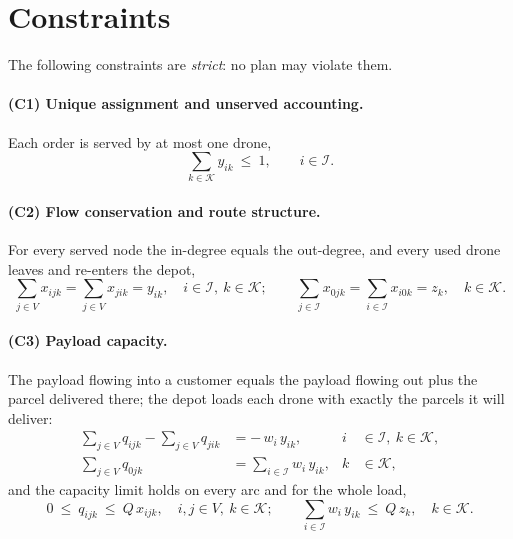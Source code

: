 \documentclass[11pt,a4paper]{article}
\begin{document}
\section{Constraints}

The following constraints are \emph{strict}: no plan may violate them.

\paragraph{(C1) Unique assignment and unserved accounting.}
Each order is served by at most one drone,
\begin{equation}
  \sum_{k\in\mathcal{K}} y_{ik} \ \le \ 1,
  \qquad i \in \mathcal{I}.
  \label{eq:ddrp-assign}
\end{equation}

\paragraph{(C2) Flow conservation and route structure.}
For every served node the in-degree equals the out-degree, and every used drone
leaves and re-enters the depot,
\begin{equation}
  \sum_{j\in V} x_{ijk} = \sum_{j\in V} x_{jik} = y_{ik},
  \quad i\in\mathcal{I},\ k\in\mathcal{K};
  \qquad
  \sum_{j\in\mathcal{I}} x_{0jk} = \sum_{i\in\mathcal{I}} x_{i0k} = z_{k},
  \quad k\in\mathcal{K}.
  \label{eq:ddrp-flow}
\end{equation}

\paragraph{(C3) Payload capacity.}
The payload flowing into a customer equals the payload flowing out plus the
parcel delivered there; the depot loads each drone with exactly the parcels it
will deliver:
\begin{align}
  \sum_{j\in V} q_{ijk} - \sum_{j\in V} q_{jik} &= -\,w_{i}\,y_{ik},
    & i &\in \mathcal{I},\ k\in\mathcal{K},
    \label{eq:ddrp-load-balance}\\
  \sum_{j\in V} q_{0jk} &= \sum_{i\in\mathcal{I}} w_{i}\,y_{ik},
    & k &\in\mathcal{K},
    \label{eq:ddrp-depot-load}
\end{align}
and the capacity limit holds on every arc and for the whole load,
\begin{equation}
  0 \ \le \ q_{ijk} \ \le \ Q\,x_{ijk},
  \quad i,j\in V,\ k\in\mathcal{K};
  \qquad
  \sum_{i\in\mathcal{I}} w_{i}\,y_{ik} \ \le \ Q\,z_{k},
  \quad k\in\mathcal{K}.
  \label{eq:ddrp-capacity}
\end{equation}
\end{document}

